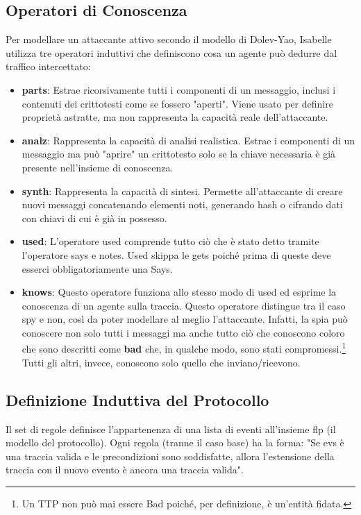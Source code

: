 \subsection{Operatori di Conoscenza}
Per modellare un attaccante attivo secondo il modello di Dolev-Yao, Isabelle utilizza tre operatori induttivi che definiscono cosa un agente può dedurre dal traffico intercettato:

\begin{itemize}
    \item \textbf{parts}: Estrae ricorsivamente tutti i componenti di un messaggio, inclusi i contenuti dei crittotesti come se fossero "aperti". Viene usato per definire proprietà astratte, ma non rappresenta la capacità reale dell'attaccante.
    \item \textbf{analz}: Rappresenta la capacità di analisi realistica. Estrae i componenti di un messaggio ma può "aprire" un crittotesto solo se la chiave necessaria è già presente nell'insieme di conoscenza.
    \item \textbf{synth}: Rappresenta la capacità di sintesi. Permette all'attaccante di creare nuovi messaggi concatenando elementi noti, generando hash o cifrando dati con chiavi di cui è già in possesso.
    \item \textbf{used}: L'operatore used comprende tutto ciò che è stato detto tramite l'operatore says e notes. Used skippa le gets poiché prima di queste deve esserci obbligatoriamente una Says.
    \item \textbf{knows}: Questo operatore funziona allo stesso modo di used ed esprime la conoscenza di un agente sulla traccia. Questo operatore distingue tra il caso spy e non, così da poter modellare al meglio l'attaccante. Infatti, la spia può conoscere non solo tutti i messaggi ma anche tutto ciò che conoscono coloro che sono descritti come \textbf{bad} che, in qualche modo, sono stati compromessi.\footnote{Un TTP non può mai essere Bad poiché, per definizione, è un'entità fidata.} Tutti gli altri, invece, conoscono solo quello che inviano/ricevono.
\end{itemize}

\subsection{Definizione Induttiva del Protocollo}
Il set di regole definisce l'appartenenza di una lista di eventi all'insieme flp (il modello del protocollo). Ogni regola (tranne il caso base) ha la forma: "Se evs è una traccia valida e le precondizioni sono soddisfatte, allora l'estensione della traccia con il nuovo evento è ancora una traccia valida".


